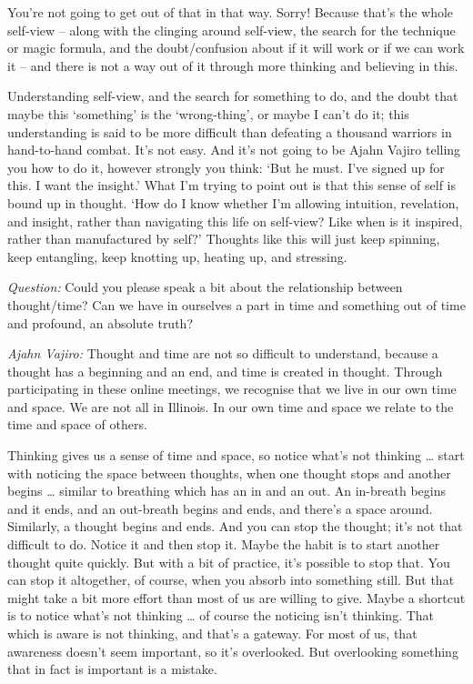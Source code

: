 You're not going to get out of that in that way. Sorry! Because that's the whole
self-view -- along with the clinging around self-view, the search for the
technique or magic formula, and the doubt/confusion about if it will work or if
we can work it -- and there is not a way out of it through more thinking and believing in this.

\enlargethispage{2\baselineskip}

Understanding self-view, and the search for something to do, and the doubt that
maybe this `something' is the `wrong-thing', or maybe I can't do it; this understanding is
said to be more difficult than defeating a thousand warriors in hand-to-hand
combat. It's not easy. And it's not going to be Ajahn Vajiro telling you how to
do it, however strongly you think: `But he must. I've signed up for this. I want
the insight.' What I'm trying to point out is that this sense of self is
bound up in thought. `How do I know whether I'm allowing intuition, revelation,
and insight, rather than navigating this life on self-view? Like when is it inspired,
rather than manufactured by self?' Thoughts like this will just keep spinning, keep
entangling, keep knotting up, heating up, and stressing.

\clearpage

\emph{Question:} Could you please speak a bit about the relationship between
thought/time? Can we have in ourselves a part in time and something out of time
and profound, an absolute truth?

\emph{Ajahn Vajiro:} Thought and time are not so difficult to understand, because a
thought has a beginning and an end, and time is created in thought. Through
participating in these online meetings, we recognise that we live in our own
time and space. We are not all in Illinois. In our own time and space we relate to the time and space of others.

Thinking gives us a sense of time and space, so notice what's not thinking \ldots{} 
start with noticing the space between thoughts, when one thought stops
and another begins \ldots{} similar to breathing which has an in and an out.
An in-breath begins and it ends, and an out-breath begins and ends, and there's
a space around. Similarly, a thought begins and ends. And you can stop the
thought; it's not that difficult to do. Notice it and then stop it. Maybe the
habit is to start another thought quite quickly. But with a bit of practice,
it's possible to stop that. You can stop it altogether, of course, when you
absorb into something still. But that might take a bit more effort than most of us are
willing to give. Maybe a shortcut is to notice what's not thinking \ldots{} of
course the noticing isn't thinking. That which is aware is not thinking, and
that's a gateway. For most of us, that awareness doesn't seem important, so it's
overlooked. But overlooking something that in fact is important is a mistake.

